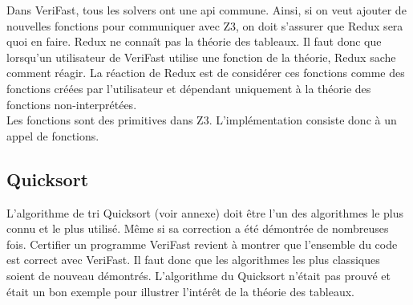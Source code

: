 \documentclass[11pt,openany]{article}
\newcommand{\verifast}{VeriFast}
\begin{document}
		Dans \verifast{}, tous les solvers ont une api commune. Ainsi, si on veut ajouter de nouvelles fonctions pour communiquer avec Z3, on doit s'assurer que Redux sera quoi en faire.
			Redux ne conna\^it pas la th\'eorie des tableaux. Il faut donc que lorsqu'un utilisateur de \verifast{} utilise une fonction de la th\'eorie, Redux sache comment r\'eagir. La r\'eaction de Redux est de consid\'erer ces fonctions comme des fonctions cr\'e\'ees par l'utilisateur et d\'ependant uniquement \`a la th\'eorie des fonctions non-interpr\'et\'ees.\\
			Les fonctions sont des primitives dans Z3. L'impl\'ementation consiste donc \`a un appel de fonctions.
			

	\subsection{Quicksort}
		L'algorithme de tri Quicksort (voir annexe) doit \^etre l'un des algorithmes le plus connu et le plus utilis\'e. M\^eme si sa correction a \'et\'e d\'emontr\'ee de nombreuses fois. Certifier un programme \verifast{} revient \`a montrer que l'ensemble du code est correct avec \verifast. Il faut donc que les algorithmes les plus classiques soient de nouveau d\'emontr\'es. L'algorithme du Quicksort n'\'etait pas prouv\'e et \'etait un bon exemple pour illustrer l'int\'er\^et de la th\'eorie des tableaux.\par 
		
\end{document}
